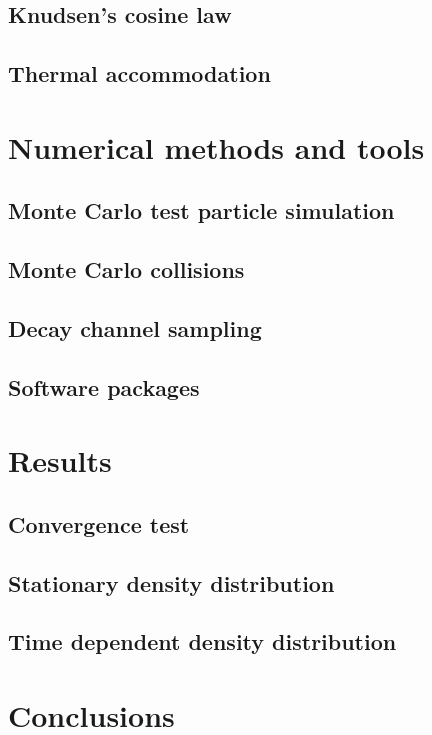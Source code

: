 \documentclass[a4paper,twoside,12pt]{article}
\begin{document}
\subsection{Knudsen's cosine law}

\subsection{Thermal accommodation}

\section{Numerical methods and tools}

\subsection{Monte Carlo test particle simulation}

\subsection{Monte Carlo collisions}

\subsection{Decay channel sampling}

\subsection{Software packages}

\section{Results}

\subsection{Convergence test}

\subsection{Stationary density distribution}

\subsection{Time dependent density distribution}

\section{Conclusions}

\clearpage



\end{document}
